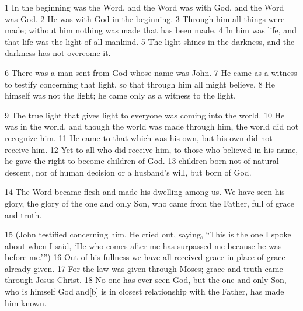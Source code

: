 \begin{abstract}
小提醒：学习的宝典当然还是google$^{\circledR}$和baidu$^{\circledR}$哦！

本文初衷是趁双旦闲暇，给以后的学位论文排版做点准备工作。有感于开源的精神，特把排版代码放到GitHub$^{\circledR}$上，在开发过程中虽然是以参考和借鉴为主，但仍按照Repository的软件工程开源流程进行操作。希望能够有人多多参与，通过这个简单的开源项目，了解、学习和推广。当然，回到根本，希望这个基于\LaTeX{}的排版项目能够给更多的同学提供一点小帮助。

\end{abstract}


\begin{englishabstract}

1 In the beginning was the Word, and the Word was with God, and the Word was God. 2 He was with God in the beginning. 3 Through him all things were made; without him nothing was made that has been made. 4 In him was life, and that life was the light of all mankind. 5 The light shines in the darkness, and the darkness has not overcome it.

6 There was a man sent from God whose name was John. 7 He came as a witness to testify concerning that light, so that through him all might believe. 8 He himself was not the light; he came only as a witness to the light.

9 The true light that gives light to everyone was coming into the world. 10 He was in the world, and though the world was made through him, the world did not recognize him. 11 He came to that which was his own, but his own did not receive him. 12 Yet to all who did receive him, to those who believed in his name, he gave the right to become children of God. 13 children born not of natural descent, nor of human decision or a husband’s will, but born of God.

14 The Word became flesh and made his dwelling among us. We have seen his glory, the glory of the one and only Son, who came from the Father, full of grace and truth.

15 (John testified concerning him. He cried out, saying, “This is the one I spoke about when I said, ‘He who comes after me has surpassed me because he was before me.’”) 16 Out of his fullness we have all received grace in place of grace already given. 17 For the law was given through Moses; grace and truth came through Jesus Christ. 18 No one has ever seen God, but the one and only Son, who is himself God and[b] is in closest relationship with the Father, has made him known.


\end{englishabstract}
